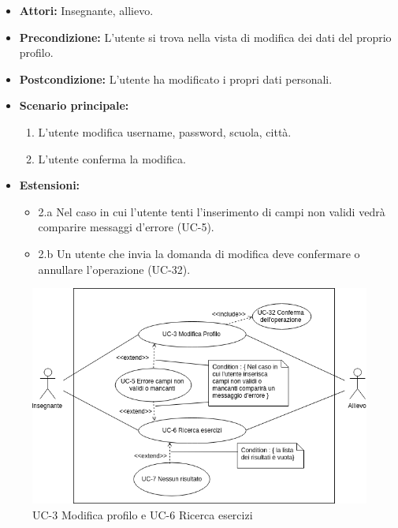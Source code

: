 	
		\begin{itemize}
			\item \textbf{Attori:} Insegnante, allievo.
			\item \textbf{Precondizione:} L'utente si trova nella vista di modifica dei dati del proprio profilo.
			\item \textbf{Postcondizione:} L'utente ha modificato i propri dati personali.
			\item \textbf{Scenario principale:}
				\begin{enumerate}
					\item L'utente modifica username, password, scuola, città.
					\item L'utente conferma la modifica. 
				\end{enumerate}
				\item \textbf{Estensioni:}
				\begin{itemize}
					\item 2.a Nel caso in cui l'utente tenti l'inserimento di campi non validi vedrà comparire messaggi d'errore (UC-5).
					\item 2.b Un utente che invia la domanda di modifica deve confermare o annullare l'operazione (UC-32).
				\end{itemize}
		\end{itemize}
		\begin{figure}[htbp]
		\centering
		\includegraphics[scale=0.7]{images/UC-3.png}
		\caption{UC-3 Modifica profilo e UC-6 Ricerca esercizi}
	\end{figure}
		
